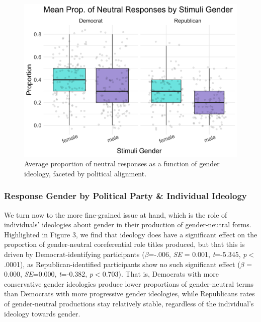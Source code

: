 \documentclass[10pt,letterpaper]{article}
\begin{document}
		\begin{figure}[ht!]
		\centering
		\includegraphics[scale=0.115]{prod_neutral_poli_box_gender.png}
		\caption{Average proportion of neutral responses as a function of gender ideology, faceted by political alignment.}
		\label{prod-neutral-poli-box-gender}
	\end{figure}
	
	\subsubsection{Response Gender by Political Party \& Individual Ideology}
	We turn now to the more fine-grained issue at hand, which is the role of individuals' ideologies about gender in their production of gender-neutral forms. Highlighted in Figure 3, we find that ideology does have a significant effect on the proportion of gender-neutral coreferential role titles produced, but that this is driven by Democrat-identifying participants ($\beta$=-.006, \textit{SE} = 0.001, \textit{t}=-5.345, \textit{p}$<$.0001), as Republican-identified participants show no such significant effect ($\beta$ = 0.000, \textit{SE}=0.000, \textit{t}=-0.382, \textit{p}$<$0.703). That is, Democrats with more conservative gender ideologies produce lower proportions of gender-neutral terms than Democrats with more progressive gender ideologies, while Republicans rates of gender-neutral productions stay relatively stable, regardless of the individual's ideology towards gender.
			
\end{document}
